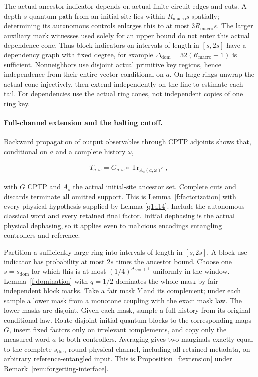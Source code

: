 The actual ancestor indicator depends on actual finite circuit edges and cuts. A depth-\(s\) quantum path from an initial site lies within \(R_{\mathrm{macro}} s\) spatially; determining its autonomous controls enlarges this to at most \(3R_{\mathrm{macro}} s\). The larger auxiliary mark witnesses used solely for an upper bound do not enter this actual dependence cone. Thus block indicators on intervals of length in \([s,2s]\) have a dependency graph with fixed degree, for example \(\Delta_{\mathrm{dom}}=32(R_{\mathrm{macro}}+1)\) is sufficient. Nonneighbors use disjoint actual primitive key regions, hence independence from their entire vector conditional on \(a\). On large rings unwrap the actual cone injectively, then extend independently on the line to estimate each tail. For dependencies use the actual ring cones, not independent copies of one ring key.

\paragraph{Full-channel extension and the halting cutoff.}

Backward propagation of output observables through CPTP adjoints shows that, conditional on \(a\) and a complete history \(\omega\),

\[
\begin{gathered}
T_{a,\omega}=G_{a,\omega}\circ\operatorname{Tr}_{A_{s}(a,\omega)^{c}},
\end{gathered}
\]

with \(G\) CPTP and \(A_{s}\) the actual initial-site ancestor set. Complete cuts and discards terminate all omitted support. This is Lemma~\ref{f:factorization} with every physical hypothesis supplied by Lemma \ref{q1:l14}. Include the autonomous classical word and every retained final factor. Initial dephasing is the actual physical dephasing, so it applies even to malicious encodings entangling controllers and reference.

Partition a sufficiently large ring into intervals of length in \([s,2s]\). A block-use indicator has probability at most \(2s\) times the ancestor bound. Choose one \(s=s_{\mathrm{dom}}\) for which this is at most \((1/4)^{\Delta_{\mathrm{dom}}+1}\) uniformly in the window. Lemma~\ref{f:domination} with \(q=1/2\) dominates the whole mask by fair independent block marks. Take a fair mask \(Y\) and its complement; under each sample a lower mask from a monotone coupling with the exact mask law. The lower masks are disjoint. Given each mask, sample a full history from its original conditional law. Route disjoint initial quantum blocks to the corresponding maps \(G\), insert fixed factors only on irrelevant complements, and copy only the measured word \(a\) to both controllers. Averaging gives two marginals exactly equal to the complete \(s_{\mathrm{dom}}\)-round physical channel, including all retained metadata, on arbitrary reference-entangled input. This is Proposition~\ref{f:extension} under Remark~\ref{rem:forgetting-interface}.

